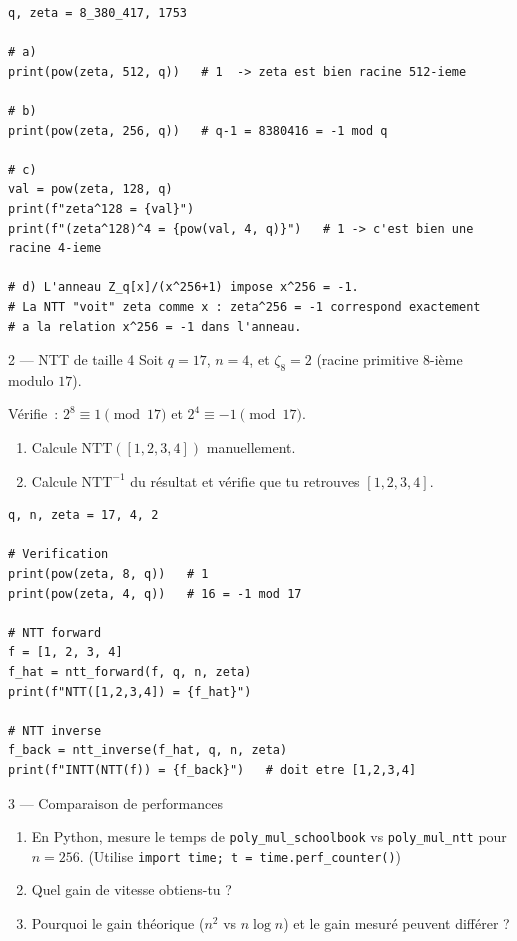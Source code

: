 \documentclass[12pt, a4paper]{article}
\newcommand{\NTT}{\mathrm{NTT}}
\newcommand{\INTT}{\mathrm{NTT}^{-1}}
\begin{document}
\begin{solution}
\begin{lstlisting}[style=python]
q, zeta = 8_380_417, 1753

# a)
print(pow(zeta, 512, q))   # 1  -> zeta est bien racine 512-ieme

# b)
print(pow(zeta, 256, q))   # q-1 = 8380416 = -1 mod q

# c)
val = pow(zeta, 128, q)
print(f"zeta^128 = {val}")
print(f"(zeta^128)^4 = {pow(val, 4, q)}")   # 1 -> c'est bien une racine 4-ieme

# d) L'anneau Z_q[x]/(x^256+1) impose x^256 = -1.
# La NTT "voit" zeta comme x : zeta^256 = -1 correspond exactement
# a la relation x^256 = -1 dans l'anneau.
\end{lstlisting}
\end{solution}

\begin{exercice}{2 --- NTT de taille 4}
Soit $q = 17$, $n = 4$, et $\zeta_8 = 2$ (racine primitive $8$-ième modulo $17$).

Vérifie~: $2^8 \equiv 1 \pmod{17}$ et $2^4 \equiv -1 \pmod{17}$.

\begin{enumerate}[label=\alph*)]
  \item Calcule $\NTT([1, 2, 3, 4])$ manuellement.
  \item Calcule $\INTT$ du résultat et vérifie que tu retrouves $[1,2,3,4]$.
\end{enumerate}
\end{exercice}

\begin{solution}
\begin{lstlisting}[style=python]
q, n, zeta = 17, 4, 2

# Verification
print(pow(zeta, 8, q))   # 1
print(pow(zeta, 4, q))   # 16 = -1 mod 17

# NTT forward
f = [1, 2, 3, 4]
f_hat = ntt_forward(f, q, n, zeta)
print(f"NTT([1,2,3,4]) = {f_hat}")

# NTT inverse
f_back = ntt_inverse(f_hat, q, n, zeta)
print(f"INTT(NTT(f)) = {f_back}")   # doit etre [1,2,3,4]
\end{lstlisting}
\end{solution}

\begin{exercice}{3 --- Comparaison de performances}
\begin{enumerate}[label=\alph*)]
  \item En Python, mesure le temps de \texttt{poly\_mul\_schoolbook} vs
        \texttt{poly\_mul\_ntt} pour $n = 256$.
        (Utilise \texttt{import time; t = time.perf\_counter()})
  \item Quel gain de vitesse obtiens-tu ?
  \item Pourquoi le gain théorique ($n^2$ vs $n\log n$) et le gain
        mesuré peuvent différer ?
\end{enumerate}
\end{exercice}
\end{document}
